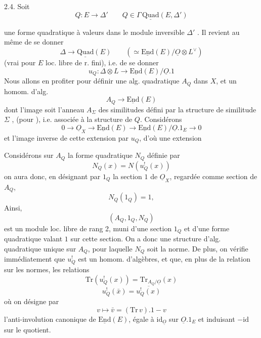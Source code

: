 \documentclass[11pt,a4paper]{article}
\begin{document}
2.4. Soit
\[
  Q : E \longrightarrow \Delta' \qquad Q \in \Gamma\, \underline{\mathrm{Quad}}(E, \Delta')
\]

une forme quadratique à valeurs dans le module inversible $\Delta'$ \add{$= \Delta^\vee$}. Il revient au même de se donner
\[
  \Delta \longrightarrow \underline{\mathrm{Quad}}(E) \qquad (\simeq \underline{\mathrm{End}}(E)/\underline{O} \otimes L^\vee)
\]
(vrai pour $E$ loc. libre de r. fini), i.e. de se donner
\[
  u_Q : \Delta \otimes L \longrightarrow \underline{\mathrm{End}}(E)/\underline{O}.1
\]
Nous allons en profiter pour définir une alg. quadratique $A_Q$ dans $X$, et un homom. d'alg.
\[
  A_Q \longrightarrow \underline{\mathrm{End}}(E)
\]
dont l'image soit l'anneau $A_\Sigma$ des similitudes  défini par la structure de similitude $\Sigma$ , (pour ), i.e. associée à la structure de $Q$. Considérons
\[
  0 \to \underline{O}_X \longrightarrow \underline{\mathrm{End}}(E) \longrightarrow \underline{\mathrm{End}}(E)/\underline{O}.1_E \to 0
\]
et  l'image inverse de cette extension par $u_Q$, d'où une extension



Considérons sur $A_Q$ la forme quadratique $N_Q$ définie par
\[
  N_Q(x) = N(u^!_Q(x))
\]
on aura donc, en désignant par $1_Q$ la section $1$ de $\underline{O}_X$, regardée comme section de $A_Q$,
\[
  N_Q(1_Q) = 1 ,
\]
Ainsi,
\[
  (A_Q, 1_Q, N_Q)
\]
est un module loc. libre de rang 2, muni d'une section $1_Q$ et d'une forme quadratique valant $1$ sur cette section. On a donc une structure d'alg. quadratique unique sur $A_Q$, pour laquelle $N_Q$ soit la norme. De plus, on vérifie immédiatement que $u^!_Q$ est un homom. d'algèbres, et que, en plus de la relation sur les normes, les relations
\[
  \mathrm{Tr}(u^!_Q(x)) = \mathrm{Tr}_{A_Q/\underline{O}}(x)
\]
\[
  u^!_Q(\bar x) = \overline{u^!_Q(x)}
\]
où on désigne par
\[
  v \longmapsto \bar v = (\mathrm{Tr}\,v).1 - v
\]
l'anti-involution canonique de $\underline{\mathrm{End}}(E)$, égale à $\mathrm{id}_{\underline{O}}$ sur $\underline{O}.1_E$ et induisant $-\mathrm{id}$ sur le quotient.
\end{document}
